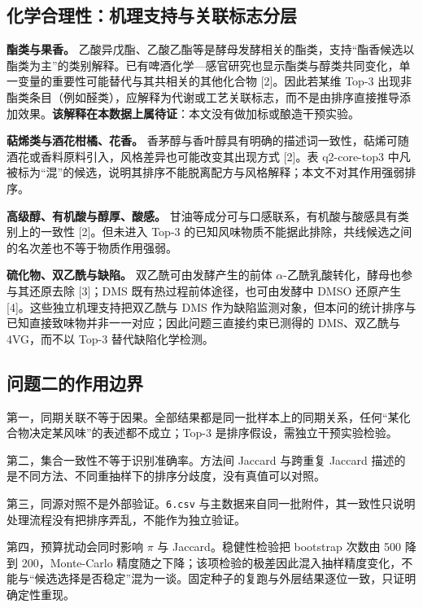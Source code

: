 \documentclass[11pt,a4paper]{article}
\begin{document}
\subsection{化学合理性：机理支持与关联标志分层}\label{ux5316ux5b66ux5408ux7406ux6027ux673aux7406ux652fux6301ux4e0eux5173ux8054ux6807ux5fd7ux5206ux5c42}

\textbf{酯类与果香。}
乙酸异戊酯、乙酸乙酯等是酵母发酵相关的酯类，支持``酯香候选以酯类为主''的类别解释。已有啤酒化学---感官研究也显示酯类与醇类共同变化，单一变量的重要性可能替代与其共相关的其他化合物
{[}2{]}。因此若某维 Top-3
出现非酯类条目（例如醛类），应解释为代谢或工艺关联标志，而不是由排序直接推导添加效果。\textbf{该解释在本数据上属待证}：本文没有做加标或酿造干预实验。

\textbf{萜烯类与酒花柑橘、花香。}
香茅醇与香叶醇具有明确的描述词一致性，萜烯可随酒花或香料原料引入，风格差异也可能改变其出现方式
{[}2{]}。表 q2-core-top3
中凡被标为``混''的候选，说明其排序不能脱离配方与风格解释；本文不对其作用强弱排序。

\textbf{高级醇、有机酸与醇厚、酸感。}
甘油等成分可与口感联系，有机酸与酸感具有类别上的一致性 {[}2{]}。但未进入
Top-3
的已知风味物质不能据此排除，共线候选之间的名次差也不等于物质作用强弱。

\textbf{硫化物、双乙酰与缺陷。} 双乙酰可由发酵产生的前体
\(\alpha\)-乙酰乳酸转化，酵母也参与其还原去除 {[}3{]}；DMS
既有热过程前体途径，也可由发酵中 DMSO 还原产生
{[}4{]}。这些独立机理支持把双乙酰与 DMS
作为缺陷监测对象，但本问的统计排序与已知直接致味物并非一一对应；因此问题三直接约束已测得的
DMS、双乙酰与 4VG，而不以 Top-3 替代缺陷化学检测。

\subsection{问题二的作用边界}\label{ux95eeux9898ux4e8cux7684ux4f5cux7528ux8fb9ux754c}

第一，同期关联不等于因果。全部结果都是同一批样本上的同期关系，任何``某化合物决定某风味''的表述都不成立；Top-3
是排序假设，需独立干预实验检验。

第二，集合一致性不等于识别准确率。方法间 Jaccard 与跨重复 Jaccard
描述的是不同方法、不同重抽样下的排序分歧度，没有真值可以对照。

第三，同源对照不是外部验证。\texttt{6.csv}
与主数据来自同一批附件，其一致性只说明处理流程没有把排序弄乱，不能作为独立验证。

第四，预算扰动会同时影响 \(\pi\) 与 Jaccard。稳健性检验把 bootstrap
次数由 500 降到 200，Monte-Carlo
精度随之下降；该项检验的极差因此混入抽样精度变化，不能与``候选选择是否稳定''混为一谈。固定种子的复跑与外层结果逐位一致，只证明确定性重现。
\end{document}
